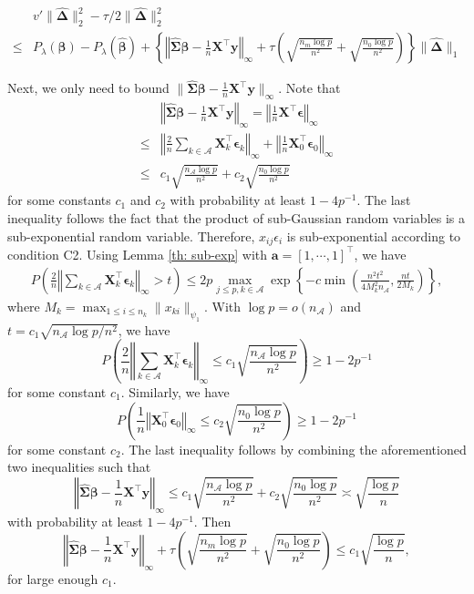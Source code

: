 \documentclass[twoside,12pt]{article}
\newcommand{\mb}[1]{\boldsymbol{\mathbf{#1}}}
\newcommand{\wh}[1]{\widehat{#1}}
\begin{document}
\begin{equation*}
	\begin{aligned}
		&v'\|\wh{\mb\Delta}\|_2^2-\tau/2\| \wh{\mb\Delta}\|_2^2\\
		\leq& P_{\lambda}(\mb\beta)-P_{\lambda}(\wh{\mb\beta})+\left\{\left\Vert\wh{\mb\Sigma}\mb\beta-\frac1n \mb X^\top\mb y\right\Vert_{\infty}+\tau \left(\sqrt{\frac{n_m\log p}{n^2}}+\sqrt{\frac{n_0\log p}{n^2}}\right)\right\}\| \wh{\mb\Delta}\|_1
	\end{aligned}
\end{equation*}

Next, we only need to bound $\|\wh{\mb\Sigma}\mb\beta-\frac1n \mb X^\top\mb y\|_{\infty}$. Note that
\begin{equation*}
	\begin{aligned}
&\left\Vert\wh{\mb\Sigma}\mb\beta-\frac1n \mb X^\top\mb y\right\Vert_{\infty}= \left\Vert\frac1n \mb X^\top\mb \epsilon\right\Vert_{\infty}\\
		\leq& \left\Vert\frac2n \sum_{k\in \mathcal{A}}\mb X_k^\top \mb\epsilon_k\right\Vert_{\infty}+\left\Vert\frac1n \mb X_0^\top \mb\epsilon_0 \right\Vert_{\infty}\\
		\leq& c_1 \sqrt{\frac{n_{\mathcal A}\log p}{n^2}}+c_2 \sqrt{\frac{n_0\log p}{n^2}}
	\end{aligned}
\end{equation*}
for some constants $c_1$ and $c_2$ with probability at least $1-4p^{-1}$.
The last inequality follows the fact that the product of sub-Gaussian random variables is a sub-exponential random variable.
Therefore, $x_{ij}\epsilon_i$ is sub-exponential according to condition C2.
Using Lemma \ref{th: sub-exp} with $\mb a=[1,\cdots,1]^\top$, we have
\begin{equation*}
	\begin{aligned}
		P\left(\frac2{n}\left\Vert\sum_{k\in\mathcal{A}}\mb X_k^\top \mb\epsilon_k\right\Vert_{\infty}>t\right)\leq 2p \max_{j\leq p, k\in\mathcal{A}} \exp\left\{-c \min\left(\frac{n^2 t^2}{4M_k^2 n_{\mathcal A}},\frac{nt}{2M_k}\right)\right\},
	\end{aligned}
\end{equation*}
where $M_k=\max_{1\leq i\leq n_k} \|x_{ki}\|_{\psi_1}$.
With $\log p=o(n_{\mathcal A})$ and $t=c_1 \sqrt{n_{\mathcal A}\log p/n^2}$, we have 
$$P\left(\frac2{n}\left\Vert\sum_{k\in\mathcal{A}}\mb X_k^\top \mb\epsilon_k\right\Vert_{\infty}\leq c_1  \sqrt{\frac{n_{\mathcal A}\log p }{n^2}}\right)\geq 1-2p^{-1}$$
for some constant $c_1$.
Similarly, we have
$$P\left(\frac1{n}\left\Vert\mb X_0^\top \mb\epsilon_0\right\Vert_{\infty}\leq c_2 \sqrt{\frac{n_0\log p}{n^2}}\right)\geq 1-2p^{-1}$$
for some constant $c_2$.
The last inequality follows by combining the aforementioned two inequalities such that
$$\left\Vert\wh{\mb\Sigma}\mb\beta-\frac1n \mb X^\top\mb y\right\Vert_{\infty}\leq c_1 \sqrt{\frac{n_{\mathcal A}\log p}{n^2}}+c_2 \sqrt{\frac{n_0\log p}{n^2}}\asymp \sqrt{\frac{\log p}{n}}$$
with probability at least $1-4p^{-1}$.
Then 
$$\left\Vert\wh{\mb\Sigma}\mb\beta-\frac1n \mb X^\top\mb y\right\Vert_{\infty}+\tau\left(\sqrt{\frac{n_m\log p}{n^2}}+\sqrt{\frac{n_0\log p}{n^2}}\right) \leq c_1 \sqrt{\frac{\log p}{n}},$$
for large enough $c_1$.
\end{document}
